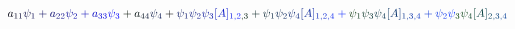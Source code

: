 \documentclass[12pt]{article}
\begin{document}
\makeatletter
\renewcommand*{\@textcolor}[3]{%
  \protect\leavevmode
  \begingroup
    \color#1{#2}#3%
  \endgroup
}
\makeatother
\begin{displaymath}
\mathcolor[RGB]{0,0,15}{a} _ { \mathcolor[RGB]{0,0,30}{1} \mathcolor[RGB]{0,0,45}{1} } \mathcolor[RGB]{0,0,60}{\psi} _ { \mathcolor[RGB]{0,0,75}{1} } \mathcolor[RGB]{0,0,90}{+} \mathcolor[RGB]{0,0,105}{a} _ { \mathcolor[RGB]{0,0,120}{2} \mathcolor[RGB]{0,0,135}{2} } \mathcolor[RGB]{0,0,150}{\psi} _ { \mathcolor[RGB]{0,0,165}{2} } \mathcolor[RGB]{0,0,180}{+} \mathcolor[RGB]{0,0,195}{a} _ { \mathcolor[RGB]{0,0,210}{3} \mathcolor[RGB]{0,0,225}{3} } \mathcolor[RGB]{0,0,240}{\psi} _ { \mathcolor[RGB]{0,0,255}{3} } \mathcolor[RGB]{0,15,0}{+} \mathcolor[RGB]{0,15,15}{a} _ { \mathcolor[RGB]{0,15,30}{4} \mathcolor[RGB]{0,15,45}{4} } \mathcolor[RGB]{0,15,60}{\psi} _ { \mathcolor[RGB]{0,15,75}{4} }

+ \mathcolor[RGB]{0,15,90}{\psi} _ { \mathcolor[RGB]{0,15,105}{1} } \mathcolor[RGB]{0,15,120}{\psi} _ { \mathcolor[RGB]{0,15,135}{2} } \mathcolor[RGB]{0,15,150}{\psi} _ { \mathcolor[RGB]{0,15,165}{3} } \mathcolor[RGB]{0,15,180}{[} \mathcolor[RGB]{0,15,195}{A} \mathcolor[RGB]{0,15,210}{]} _ { \mathcolor[RGB]{0,15,225}{1} \mathcolor[RGB]{0,15,240}{,} \mathcolor[RGB]{0,15,255}{2} \mathcolor[RGB]{0,30,0}{,} \mathcolor[RGB]{0,30,15}{3} } \mathcolor[RGB]{0,30,30}{+} \mathcolor[RGB]{0,30,45}{\psi} _ { \mathcolor[RGB]{0,30,60}{1} } \mathcolor[RGB]{0,30,75}{\psi} _ { \mathcolor[RGB]{0,30,90}{2} } \mathcolor[RGB]{0,30,105}{\psi} _ { \mathcolor[RGB]{0,30,120}{4} } \mathcolor[RGB]{0,30,135}{[} \mathcolor[RGB]{0,30,150}{A} \mathcolor[RGB]{0,30,165}{]} _ { \mathcolor[RGB]{0,30,180}{1} \mathcolor[RGB]{0,30,195}{,} \mathcolor[RGB]{0,30,210}{2} \mathcolor[RGB]{0,30,225}{,} \mathcolor[RGB]{0,30,240}{4} } \mathcolor[RGB]{0,30,255}{+} \mathcolor[RGB]{0,45,0}{\psi} _ { \mathcolor[RGB]{0,45,15}{1} } \mathcolor[RGB]{0,45,30}{\psi} _ { \mathcolor[RGB]{0,45,45}{3} } \mathcolor[RGB]{0,45,60}{\psi} _ { \mathcolor[RGB]{0,45,75}{4} } \mathcolor[RGB]{0,45,90}{[} \mathcolor[RGB]{0,45,105}{A} \mathcolor[RGB]{0,45,120}{]} _ { \mathcolor[RGB]{0,45,135}{1} \mathcolor[RGB]{0,45,150}{,} \mathcolor[RGB]{0,45,165}{3} \mathcolor[RGB]{0,45,180}{,} \mathcolor[RGB]{0,45,195}{4} } \mathcolor[RGB]{0,45,210}{+} \mathcolor[RGB]{0,45,225}{\psi} _ { \mathcolor[RGB]{0,45,240}{2} } \mathcolor[RGB]{0,45,255}{\psi} _ { \mathcolor[RGB]{0,60,0}{3} } \mathcolor[RGB]{0,60,15}{\psi} _ { \mathcolor[RGB]{0,60,30}{4} } \mathcolor[RGB]{0,60,45}{[} \mathcolor[RGB]{0,60,60}{A} \mathcolor[RGB]{0,60,75}{]} _ { \mathcolor[RGB]{0,60,90}{2} \mathcolor[RGB]{0,60,105}{,} \mathcolor[RGB]{0,60,120}{3} \mathcolor[RGB]{0,60,135}{,} \mathcolor[RGB]{0,60,150}{4} } \,
\end{displaymath}
\end{document}
